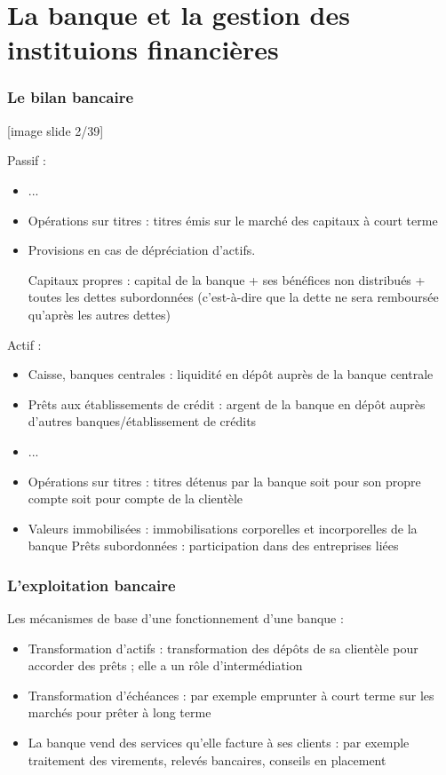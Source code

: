 \part{La banque et la gestion des instituions financières}

	\section{Le bilan bancaire}
	
	[image slide 2/39]
	
	Passif :
	
	\begin{itemize}
		\item ...
		\item Opérations sur titres : titres émis sur le marché des capitaux à court terme
		\item Provisions en cas de dépréciation d'actifs. 
		
			Capitaux propres : capital de la banque + ses bénéfices non distribués + toutes les dettes subordonnées (c'est-à-dire que la dette ne sera remboursée qu'après les autres dettes)
	\end{itemize}
	
	Actif :
	
	\begin{itemize}
		\item Caisse, banques centrales : liquidité en dépôt auprès de la banque centrale
		\item Prêts aux établissements de crédit : argent de la banque en dépôt auprès d'autres banques/établissement de crédits
		\item ...
		\item Opérations sur titres : titres détenus par la banque soit pour son propre compte soit pour compte de la clientèle
		\item Valeurs immobilisées : immobilisations corporelles et incorporelles de la banque
		Prêts subordonnées : participation dans des entreprises liées
	\end{itemize}
	
	\section{L'exploitation bancaire}
	
	Les mécanismes de base d'une fonctionnement d'une banque :
	
	\begin{itemize}
		\item Transformation d'actifs : transformation des dépôts de sa clientèle pour accorder des prêts ; elle a un rôle d'intermédiation
		\item Transformation d'échéances : par exemple emprunter à court terme sur les marchés pour prêter à long terme
		\item La banque vend des services qu'elle facture à ses clients : par exemple traitement des virements, relevés bancaires, conseils en placement
	\end{itemize}
	
